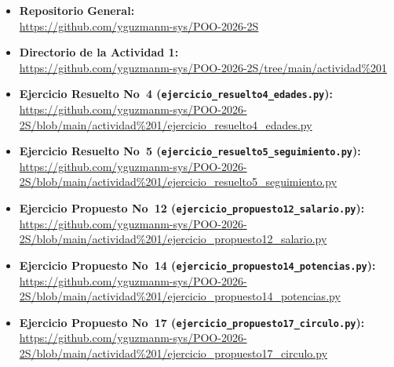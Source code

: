 \documentclass[12pt,a4paper]{article}
\begin{document}
\begin{itemize}
    \setlength\itemsep{0.5em}
    \item \textbf{Repositorio General:} \\
    \url{https://github.com/yguzmanm-sys/POO-2026-2S}
    \item \textbf{Directorio de la Actividad 1:} \\
    \url{https://github.com/yguzmanm-sys/POO-2026-2S/tree/main/actividad%201}
    \item \textbf{Ejercicio Resuelto No~4 (\texttt{ejercicio\_resuelto4\_edades.py}):} \\
    \url{https://github.com/yguzmanm-sys/POO-2026-2S/blob/main/actividad%201/ejercicio_resuelto4_edades.py}
    \item \textbf{Ejercicio Resuelto No~5 (\texttt{ejercicio\_resuelto5\_seguimiento.py}):} \\
    \url{https://github.com/yguzmanm-sys/POO-2026-2S/blob/main/actividad%201/ejercicio_resuelto5_seguimiento.py}
    \item \textbf{Ejercicio Propuesto No~12 (\texttt{ejercicio\_propuesto12\_salario.py}):} \\
    \url{https://github.com/yguzmanm-sys/POO-2026-2S/blob/main/actividad%201/ejercicio_propuesto12_salario.py}
    \item \textbf{Ejercicio Propuesto No~14 (\texttt{ejercicio\_propuesto14\_potencias.py}):} \\
    \url{https://github.com/yguzmanm-sys/POO-2026-2S/blob/main/actividad%201/ejercicio_propuesto14_potencias.py}
    \item \textbf{Ejercicio Propuesto No~17 (\texttt{ejercicio\_propuesto17\_circulo.py}):} \\
    \url{https://github.com/yguzmanm-sys/POO-2026-2S/blob/main/actividad%201/ejercicio_propuesto17_circulo.py}
\end{itemize}
\end{document}
